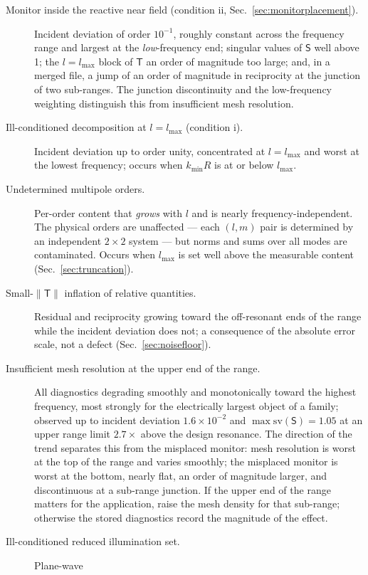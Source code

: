\documentclass[11pt]{article}
\begin{document}
\begin{description}
\item[Monitor inside the reactive near field (condition ii,
Sec.~\ref{sec:monitorplacement}).]  Incident deviation of order
$10^{-1}$, roughly constant across the frequency range and largest at the
\emph{low}-frequency end; singular values of $\mathsf{S}$ well above
1; the $l = l_{\max}$ block of $\mathsf{T}$ an order of magnitude too
large; and, in a merged file, a jump of an order of magnitude in
reciprocity at the junction of two sub-ranges.  The junction
discontinuity and
the low-frequency weighting distinguish this from insufficient mesh
resolution.
\item[Ill-conditioned decomposition at $l = l_{\max}$ (condition i).]
Incident deviation up to order unity, concentrated at $l = l_{\max}$
and worst at the lowest frequency; occurs when $k_{\min}R$ is at or
below $l_{\max}$.
\item[Undetermined multipole orders.]  Per-order content that
\emph{grows} with $l$ and is nearly frequency-independent.  The
physical orders are unaffected --- each $(l,m)$ pair is determined by
an independent $2\times 2$ system --- but norms and sums over all
modes are contaminated.  Occurs when $l_{\max}$ is set well above the
measurable content (Sec.~\ref{sec:truncation}).
\item[Small-$\|\mathsf{T}\|$ inflation of relative quantities.]
Residual and reciprocity growing toward the off-resonant ends of the
range while
the incident deviation does not; a consequence of the absolute error
scale, not a defect (Sec.~\ref{sec:noisefloor}).
\item[Insufficient mesh resolution at the upper end of the range.]  All
diagnostics degrading smoothly and monotonically toward the highest
frequency, most strongly for the electrically largest object of a
family; observed up to incident deviation $1.6\times10^{-2}$ and
$\max\mathrm{sv}(\mathsf{S}) = 1.05$ at an upper range limit $2.7\times$ above
the design resonance.  The direction of the trend separates this from
the misplaced monitor: mesh resolution is worst at the top of the
range and varies smoothly; the misplaced monitor is worst at the
bottom,
nearly flat, an order of magnitude larger, and discontinuous at a
sub-range junction.  If the upper end of the range matters for the
application, raise the mesh density for that sub-range; otherwise the stored
diagnostics record the magnitude of the effect.
\item[Ill-conditioned reduced illumination set.]  Plane-wave

\end{description}
\end{document}

